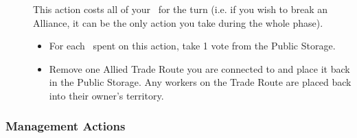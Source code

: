 \documentclass[10pt,twocolumn]{article}
\begin{document}
\begin{description}
\item[] This action costs all of your \polfs\ for the turn (i.e. if you wish to break an Alliance, it can be the only action you take during the whole  phase).
\begin{itemize}
\item For each \polf\ spent on this action, take 1 vote from the Public Storage.
\item Remove one Allied Trade Route you are connected to and place it back in the Public Storage. Any workers on the Trade Route are placed back into their owner's territory.
\end{itemize}
\end{description}

\subsubsection{Management Actions}
\end{document}

